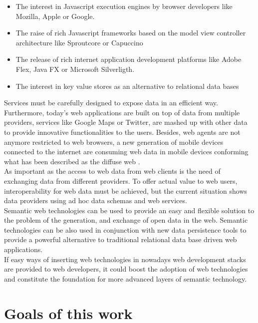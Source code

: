 \begin{itemize}
\item The interest in Javascript execution engines by browser developers like Mozilla,
Apple or Google. 
\item The raise of rich Javascript frameworks based on the model view controller architecture like Sproutcore or
  Capuccino
\item The release of rich internet application development platforms like Adobe Flex, Java FX or Microsoft Silverligth.
\item The interest in key value stores as an alternative to relational data bases
\end{itemize}


Services must be carefully designed to expose data in an efficient way. Furthermore, today's web applications are built on top of data
from multiple providers, services like Google Maps or Twitter, are mashed up with other data to provide innovative
functionalities to the users. Besides, web agents are not anymore restricted to web browsers, a new generation of mobile
devices connected to the internet are consuming web data in mobile devices conforming what has been described as the
diffuse web \cite{conf/coordination/Serrano09}.\\

As important as the access to web data from web clients is the need of exchanging data from different providers. To
offer actual value to web users, interoperability for web data must be achieved, but the current situation shows data
providers using ad hoc data schemas and web services.\\

Semantic web technologies can be used to provide an easy and flexible solution to the problem of the generation, and
exchange of open data in the web. Semantic technologies can be also used in conjunction with new data persistence tools to
provide a powerful alternative to traditional relational data base driven web applications.\\

If easy ways of inserting web technologies in nowadays web development stacks are provided to web developers, it could
boost the adoption of web technologies and constitute the foundation for more advanced layers of semantic technology. 


\section{Goals of this work}

